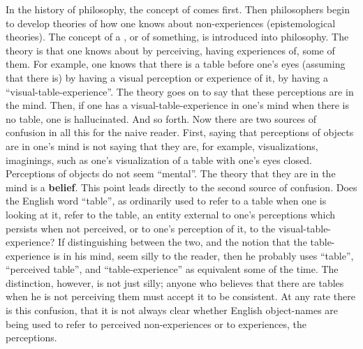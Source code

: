 In the history of philosophy, the concept of  comes first. 
Then philosophers begin to develop theories of how one knows about 
non-experiences (epistemological theories). The concept of a , or 
 of something, is introduced into philosophy. The theory is that 
one knows about  by perceiving, having experiences of, some 
of them. For example, one knows that there is a table before one's eyes 
(assuming that there is) by having a visual perception or experience of it, by 
having a \enquote{visual-table-experience}. The theory goes on to say that these 
perceptions are in the mind. Then, if one has a visual-table-experience in 
one's mind when there is no table, one is hallucinated. And so forth. Now 
there are two sources of confusion in all this for the naive reader. First, 
saying that perceptions of objects are in one's mind is not saying that they 
are, for example, visualizations, imaginings, such as one's visualization of a 
table with one's eyes closed. Perceptions of objects do not seem \enquote{mental}. 
The theory that they are in the mind is a \textbf{belief}. This point leads directly to 
the second source of confusion. Does the English word \enquote{table}, as ordinarily 
used to refer to a table when one is looking at it, refer to the table, an entity 
external to one's perceptions which persists when not perceived, or to one's 
perception of it, to the visual-table-experience? If distinguishing between 
the two, and the notion that the table-experience is in his mind, seem silly to 
the reader, then he probably uses \enquote{table}, \enquote{perceived table}, and 
\enquote{table-experience} as equivalent some of the time. The distinction, however, 
is not just silly; anyone who believes that there are tables when he is not 
perceiving them must accept it to be consistent. At any rate there is this 
confusion, that it is not always clear whether English object-names are being 
used to refer to perceived non-experiences or to experiences, the 
perceptions. 

